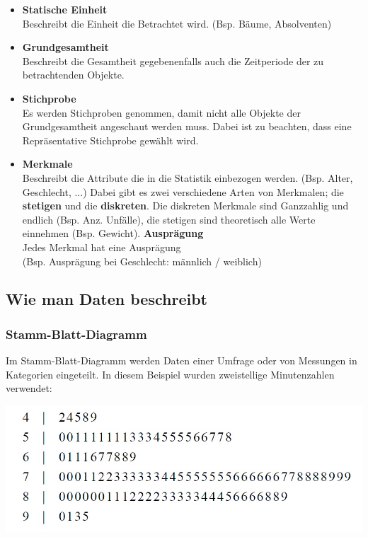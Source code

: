 \documentclass[12pt,a4paper]{article} %
\begin{document}
\begin{itemize}
\item \textbf{Statische Einheit}\\
Beschreibt die Einheit die Betrachtet wird. (Bsp. Bäume, Absolventen)
\item \textbf{Grundgesamtheit}\\
Beschreibt die Gesamtheit gegebenenfalls auch die Zeitperiode der zu betrachtenden Objekte.
\item \textbf{Stichprobe}\\
Es werden Stichproben genommen, damit nicht alle Objekte der Grundgesamtheit angeschaut werden muss. Dabei ist zu beachten, dass eine\\Repräsentative Stichprobe gewählt wird.
\item \textbf{Merkmale}\\
Beschreibt die Attribute die in die Statistik einbezogen werden. (Bsp. Alter, Geschlecht, ...) Dabei gibt es zwei verschiedene Arten von Merkmalen; die \textbf{stetigen} und die \textbf{diskreten}. Die diskreten Merkmale sind Ganzzahlig und endlich (Bsp. Anz. Unfälle), die stetigen sind theoretisch alle Werte einnehmen (Bsp. Gewicht).
\textbf{Ausprägung}\\
Jedes Merkmal hat eine Ausprägung\\(Bsp. Ausprägung bei Geschlecht: männlich / weiblich)
\end{itemize}
\pagebreak
\subsection{Wie man Daten beschreibt}
\subsubsection{Stamm-Blatt-Diagramm}

Im Stamm-Blatt-Diagramm werden Daten einer Umfrage oder von Messungen in Kategorien eingeteilt. In diesem Beispiel wurden zweistellige Minutenzahlen verwendet:\\
\begin{center}
\includegraphics[scale=0.5]{stammdaten.jpg}
\end{center}
\end{document}
